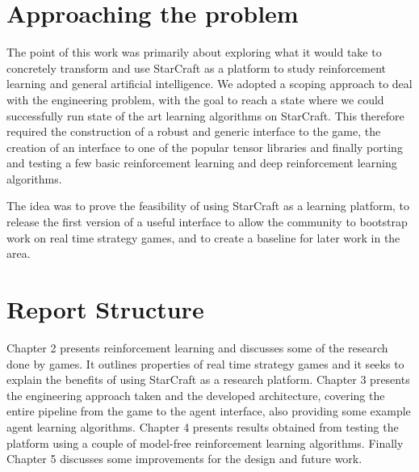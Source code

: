 \section{Approaching the problem} %

The point of this work was primarily about exploring what it would take to
concretely transform and use StarCraft as a platform to study reinforcement
learning and general artificial intelligence. We adopted a scoping approach to
deal with the engineering problem, with the goal to reach a state where we could
successfully run state of the art learning algorithms on StarCraft. This
therefore required the construction of a robust and generic interface to the
game, the creation of an interface to one of the popular tensor libraries and
finally porting and testing a few basic reinforcement learning and deep
reinforcement learning algorithms.

The idea was to prove the feasibility of using StarCraft as a learning platform,
to release the first version of a useful interface to allow the community to
bootstrap work on real time strategy games, and to create a baseline for later
work in the area.

\section{Report Structure}

Chapter 2 presents reinforcement learning and discusses some of the research
done by games. It outlines properties of real time strategy games and it seeks
to explain the benefits of using StarCraft as a research platform. Chapter 3
presents the engineering approach taken and the developed architecture, covering
the entire pipeline from the game to the agent interface, also providing some
example agent learning algorithms. Chapter 4 presents results obtained from
testing the platform using a couple of model-free reinforcement learning
algorithms. Finally Chapter 5 discusses some improvements for the design and
future work.
